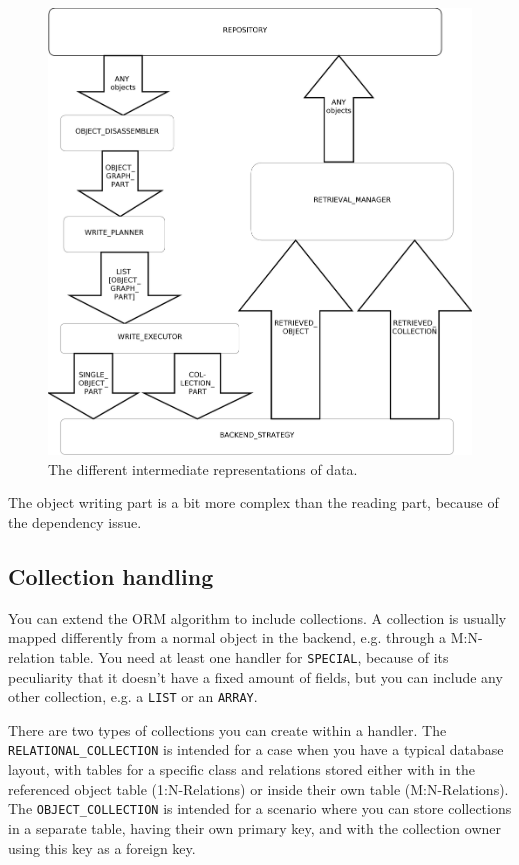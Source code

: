 \begin{figure} [h!]
\centering
\includegraphics[trim= 0mm -10mm 0mm -10mm,clip, width = 13cm] {includes/dataflow.png}
\caption{The different intermediate representations of data.}
\label{fig:intermediate_data_orm}
\end{figure}


The object writing part is a bit more complex than the reading part, because of the dependency issue.


\subsection{Collection handling}

You can extend the ORM algorithm to include collections. A collection is usually mapped differently from a normal object in the backend, e.g. through a M:N-relation table.
You need at least one handler for \lstinline!SPECIAL!, because of its peculiarity that it doesn't have a fixed amount of fields, but you can include any other collection, e.g. a \lstinline!LIST! or an \lstinline!ARRAY!.

There are two types of collections you can create within a handler. 
The \lstinline!RELATIONAL_COLLECTION! is intended for a case when you have a typical database layout, with tables for a specific class and relations stored either with in the referenced object table (1:N-Relations) or inside their own table (M:N-Relations).
The \lstinline!OBJECT_COLLECTION! is intended for a scenario where you can store collections in a separate table, having their own primary key, and with the collection owner using this key as a foreign key.

